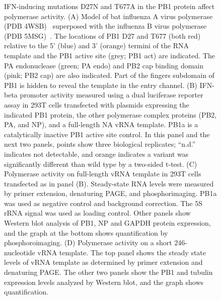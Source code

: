 \documentclass[]{article}
\begin{document}
\begin{figure}
\caption{
IFN-inducing mutations D27N and T677A in the PB1 protein affect polymerase activity. 
(A) Model of bat influenza A virus polymerase (PDB 4WSB)~\cite{reich2014structural} superposed with the influenza B virus polymerase (PDB 5MSG)~\cite{reich2017vitro}.
The locations of PB1 D27 and T677 (both red) relative to the 5' (blue) and 3' (orange) termini of the RNA template and the PB1 active site (grey; PB1 act) are indicated.
The PA endonuclease (green; PA endo) and PB2 cap binding domain (pink; PB2 cap) are also indicated. 
Part of the fingers subdomain of PB1 is hidden to reveal the template in the entry channel. 
(B) IFN-beta promoter activity measured using a dual luciferase reporter assay in 293T cells transfected with plasmids expressing the indicated PB1 protein, the other polymerase complex proteins (PB2, PA, and NP), and a full-length NA vRNA template.
PB1a is a catalytically inactive PB1 active site control.
In this panel and the next two panels, points show three biological replicates; ``n.d.'' indicates not detectable, and orange indicates a variant was significantly different than wild type by a two-sided t-test.
(C) Polymerase activity on full-length vRNA template in 293T cells transfected as in panel (B).
Steady-state RNA levels were measured by primer extension, denaturing PAGE, and phosphorimaging. 
PB1a was used as negative control and background correction. 
The 5S rRNA signal was used as loading control. 
Other panels show Western blot analysis of PB1, NP and GAPDH protein expression, and the graph at the bottom shows quantification by phosphoroimaging. 
(D) Polymerase activity on a short 246-nucleotide vRNA template. 
The top panel shows the steady state levels of vRNA template as determined by primer extension and denaturing PAGE. 
The other two panels show the PB1 and tubulin expression levels analyzed by Western blot, and the graph shows quantification.
}
\end{figure}
\end{document}
